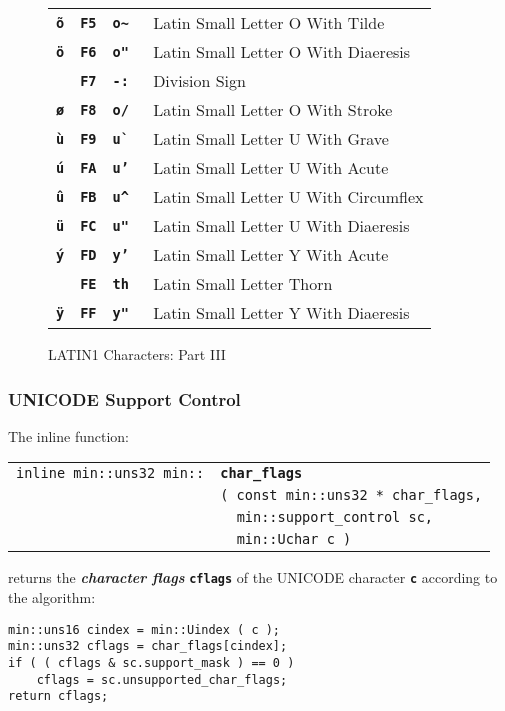 \documentclass[12pt]{article}
\makeatletter
\newcommand{\TT}[1]{{\tt \bfseries #1}}
\newcommand{\skey}[2]{{\bf \em #1#2}\index{#1}}
\newcommand{\ttindex}[1]{\index{#1@{\tt #1}}}
\newlength{\figurewidth}
\newenvironment{boxedfigure}[1][!btp]%
	{\begin{figure*}[#1]
	 \begin{lrbox}{\figurebox}
	 \begin{minipage}{\figurewidth}

	 \vspace*{1ex}}%
	{
	 \vspace*{1ex}

	 \end{minipage}
	 \end{lrbox}

	 \vspace*{-15ex}
	 \centering
	 \fbox{\hspace*{0.1in}\usebox{\figurebox}\hspace*{0.1in}}
	 \end{figure*}}
\newenvironment{indpar}[1][0.3in]%
	{\begin{list}{}%
		     {\setlength{\itemsep}{0in}%
		      \setlength{\topsep}{0in}%
		      \setlength{\parsep}{1ex}%
		      \setlength{\labelwidth}{#1}%
		      \setlength{\leftmargin}{#1}%
		      \addtolength{\leftmargin}{\labelsep}}%
	 \item}%
	{\end{list}}
\newcommand{\LABEL}[1]{\label{#1}}
\newlength{\ARGBREAKLENGTH}
\newcommand{\ARGBREAK}[1][\ARGBREAKLENGTH]{\\&\hspace*{#1}}
\newcommand{\MINKEY}[1]%
	   {\TT{#1}\ttindex{min::#1}\ttindex{#1}}
\makeatother
\begin{document}
\begin{boxedfigure}
\begin{tabular}{llll}
\TT{\~o}
  & \TT{F5} & \TT{o\textasciitilde} & Latin Small Letter O With Tilde \\
\TT{\"o}
  & \TT{F6} & \TT{o"} & Latin Small Letter O With Diaeresis \\
\TT{\textdiv}
  & \TT{F7} & \TT{-:} & Division Sign \\
\TT{\o}
  & \TT{F8} & \TT{o/} & Latin Small Letter O With Stroke \\
\TT{\`u}
  & \TT{F9} & \TT{u\`~} & Latin Small Letter U With Grave \\
\TT{\'u}
  & \TT{FA} & \TT{u'} & Latin Small Letter U With Acute \\
\TT{\^u}
  & \TT{FB} & \TT{u\textasciicircum} & Latin Small Letter U With Circumflex \\
\TT{\"u}
  & \TT{FC} & \TT{u"} & Latin Small Letter U With Diaeresis \\
\TT{\'y}
  & \TT{FD} & \TT{y'} & Latin Small Letter Y With Acute \\
\TT{\th}
  & \TT{FE} & \TT{th} & Latin Small Letter Thorn \\
\TT{\"y}
  & \TT{FF} & \TT{y"} & Latin Small Letter Y With Diaeresis \\
\end{tabular}
\caption{LATIN1 Characters: Part III}
\label{LATIN1-CHARACTERS-III}
\end{boxedfigure}

\newpage

\subsubsection{UNICODE Support Control}
\label{UNICODE-SUPPORT-CONTROL}

The inline function:

\begin{indpar}\begin{tabular}{r@{}l}
\verb|inline min::uns32 min::| & \MINKEY{char\_flags}\ARGBREAK
      \verb|( const min::uns32 * char_flags,|\ARGBREAK
      \verb|  min::support_control sc,|\ARGBREAK
      \verb|  min::Uchar c )|
\LABEL{MIN::CHAR_FLAGS} \\
\end{tabular}\end{indpar}

returns the \skey{character flag}s \TT{cflags} of the UNICODE character
\TT{c} according to the algorithm:

\begin{indpar}\begin{verbatim}
min::uns16 cindex = min::Uindex ( c );
min::uns32 cflags = char_flags[cindex];
if ( ( cflags & sc.support_mask ) == 0 )
    cflags = sc.unsupported_char_flags;
return cflags;
\end{verbatim}\end{indpar}
\end{document}
